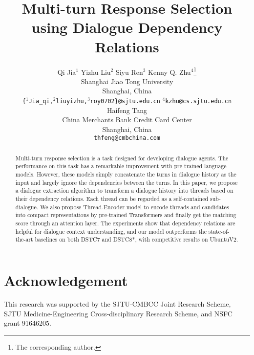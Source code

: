 \documentclass[11pt,a4paper]{article}
\title{Multi-turn Response Selection using Dialogue Dependency Relations}
\author{Qi Jia$^1$ \hspace*{1cm}
	Yizhu Liu$^2$ \hspace*{1cm}
  	Siyu Ren$^3$ \hspace*{1cm} Kenny Q. Zhu$^4$\thanks{\hspace{2mm}The corresponding author.}\\
  Shanghai Jiao Tong University \\
  Shanghai, China \\
  \texttt{\{$^1$Jia\_qi,$^2$liuyizhu,$^3$roy0702\}@sjtu.edu.cn} \hfill
  \texttt{$^4$kzhu@cs.sjtu.edu.cn} \\ 
  \AND
  Haifeng Tang \\
 China Merchants Bank Credit Card Center\\
  Shanghai, China \\
  \texttt{thfeng@cmbchina.com} \\
}
\date{}
\begin{document}
\maketitle
\begin{abstract}
Multi-turn response selection is a task designed for developing dialogue agents. The performance on this task has a remarkable improvement with
pre-trained language models. However, these models simply concatenate the turns in dialogue history as the input and largely ignore the dependencies between the turns. In this paper,  we propose a dialogue extraction algorithm to transform a dialogue history into threads based on their dependency relations. Each thread can be regarded as a self-contained sub-dialogue. We also propose Thread-Encoder model to encode threads and candidates into compact
representations by pre-trained Transformers and finally get the matching score through an attention layer. The experiments show that dependency relations are helpful for dialogue context understanding, and our model outperforms the state-of-the-art baselines on both DSTC7 and DSTC8*, with competitive results on UbuntuV2.
\end{abstract}
















\section*{Acknowledgement}
This research was supported by the SJTU-CMBCC Joint Research Scheme, 
SJTU Medicine-Engineering Cross-disciplinary Research Scheme, and NSFC
grant 91646205.



\end{document}

